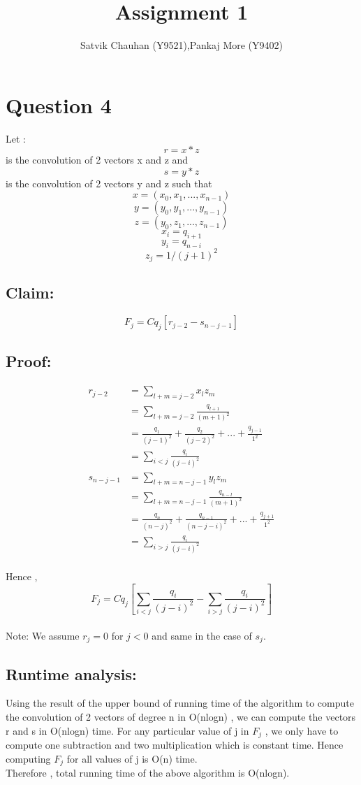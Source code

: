 \documentclass{article}
\title{Assignment 1}
\author{Satvik Chauhan (Y9521),Pankaj More (Y9402)}
\date{}
\begin{document}
\maketitle
\section{Question 4}
Let : 
\[r = x * z \] is the convolution of 2 vectors x and z and \\
\[s = y * z \] is the convolution of 2 vectors y and z such that
\[x = (x_{0},x_{1},...,x_{n-1})\]
\[y = (y_{0},y_{1},...,y_{n-1})\]
\[z = (y_{0},z_{1},...,z_{n-1})\]
\[x_{i} = q_{i+1}\]
\[y_{i} = q_{n-i}\]
\[z_{j} = 1/(j+1)^2\]

\subsection*{Claim:} \[F_j = Cq_j[r_{j-2} - s_{n-j-1}]\]

\subsection*{Proof:}
\begin{align*}
r_{j-2} & = \sum_{l+m=j-2} x_lz_m \\
&= \sum_{l+m=j-2} \frac{q_{l+1}}{(m+1)^2} \\
&= \frac{q_1}{(j-1)^2} + \frac{q_2}{(j-2)^2} + ... + \frac{q_{j-1}}{1^2} \\
&= \sum_{i<j} \frac{q_i}{(j-i)^2} \\
s_{n-j-1} & = \sum_{l+m=n-j-1} y_lz_m \\
&= \sum_{l+m=n-j-1} \frac{q_{n-l}}{(m+1)^2} \\
&= \frac{q_n}{(n-j)^2} + \frac{q_{n-1}}{(n-j-i)^2} + ... + \frac{q_{j+1}}{1^2} \\
&= \sum_{i>j} \frac{q_i}{(j-i)^2} \\ 
\end{align*}

Hence , 
\[F_j = Cq_j[\sum_{i<j} \frac{q_{i}}{(j-i)^2} - \sum_{i>j} \frac{q_{i}}{(j-i)^2}  ]\] 
\\
Note: We assume $r_j = 0$ for $j < 0$ and same in the case of $s_j$.

\subsection*{Runtime analysis:}
Using the result of the upper bound of running time of the algorithm to compute the convolution of 2 vectors of degree n in O(nlogn) , we can compute the vectors r and s in O(nlogn) time.
For any particular value of j in $F_j$ , we only have to compute one subtraction and two multiplication which is constant time. Hence computing $F_j$ for all values of j is O(n) time. \\
Therefore , total running time of the above algorithm is O(nlogn).
\end{document}
